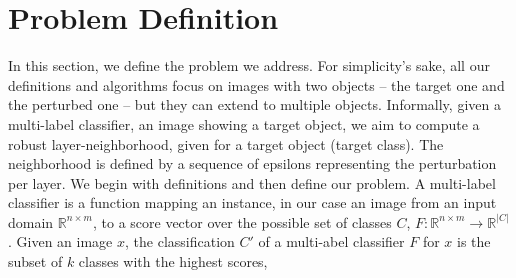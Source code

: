 
\section{Problem Definition}
In this section, we define the problem we address.
For simplicity's sake, all our definitions and algorithms focus on images with two objects -- the target one and the perturbed one -- but they can extend to multiple objects.
Informally, given a multi-label classifier, an image showing a target object, we aim to compute a robust layer-neighborhood, given for a target object (target class).
The neighborhood is defined by a sequence of epsilons representing the perturbation per layer.
We begin with definitions and then define our problem.
A multi-label classifier is a function mapping an instance, in our case an image from an input domain $\mathbb{R}^{n \times m}$, to a score vector over the possible set of classes $C$,
$F: \mathbb{R}^{n \times m} \rightarrow {\mathbb{R}}^{|C|}$.
Given an image $x$, the classification $C'$ of a multi-abel classifier $F$ for $x$ is the subset of $k$ classes with the highest scores,
